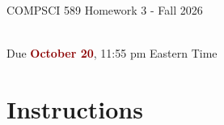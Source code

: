 \documentclass{article}
\begin{document}
\newpage
\vspace*{1cm}
\begin{center}
    \begin{Large}
    COMPSCI 589 Homework 3 - Fall 2026
    \end{Large}
    \\
    \vspace{0.15cm}
    Due \textcolor{darkred}{\textbf{October 20}}, 11:55 pm Eastern Time
\end{center}





\vspace{0.5cm}
\section*{Instructions}
\vspace{0.5cm}
\end{document}
